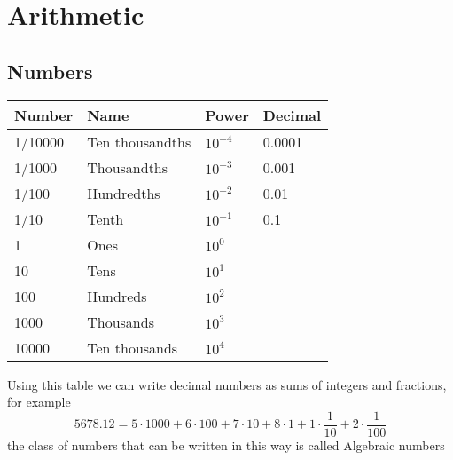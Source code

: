 \chapter{Arithmetic}\label{arit}

\section{Numbers}
\begin{table}[H]
\centering
\begin{tabular}{|l|l|l|l|}
\hline
\textbf{Number} & \textbf{Name}   & \textbf{Power} & \textbf{Decimal} \\ \hline
1/10000         & Ten thousandths & $10^{-4}$      & 0.0001           \\ \hline
1/1000          & Thousandths     & $10^{-3}$      & 0.001            \\ \hline
1/100           & Hundredths      & $10^{-2}$      & 0.01             \\ \hline
1/10            & Tenth           & $10^{-1}$      & 0.1              \\ \hline
1               & Ones            & $10^0$         &                  \\ \hline
10              & Tens            & $10^1$         &                  \\ \hline
100             & Hundreds        & $10^2$         &                  \\ \hline
1000            & Thousands       & $10^3$         &                  \\ \hline
10000           & Ten thousands   & $10^4$         &                  \\ \hline
\end{tabular}
\end{table}

\noindent Using this table we can write decimal numbers as sums of integers and fractions, for example
\[
5678.12 = 5 \cdot 1000 + 6 \cdot 100 + 7 \cdot 10 + 8 \cdot 1 + 1 \cdot
\frac{1}{10} + 2 \cdot \frac{1}{100}
\]
the class of numbers that can be written in this way is called Algebraic numbers

